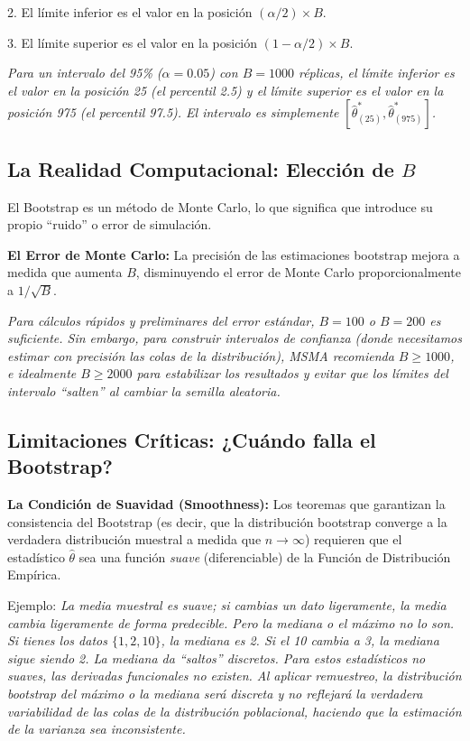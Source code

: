 \documentclass[a4paper]{article}
\begin{document}
2. El límite inferior es el valor en la posición $(\alpha/2) \times B$.

3. El límite superior es el valor en la posición $(1-\alpha/2) \times B$.

\textit{Para un intervalo del 95\% ($\alpha=0.05$) con $B=1000$ réplicas, el límite inferior es el valor en la posición 25 (el percentil 2.5) y el límite superior es el valor en la posición 975 (el percentil 97.5). El intervalo es simplemente $[\hat{\theta}^*_{(25)}, \hat{\theta}^*_{(975)}]$.}

\subsection{La Realidad Computacional: Elección de \texorpdfstring{$B$}{B}}

El Bootstrap es un método de Monte Carlo, lo que significa que introduce su propio ``ruido'' o error de simulación.

\textbf{El Error de Monte Carlo:}
La precisión de las estimaciones bootstrap mejora a medida que aumenta $B$, disminuyendo el error de Monte Carlo proporcionalmente a $1/\sqrt{B}$. 

\textit{Para cálculos rápidos y preliminares del error estándar, $B=100$ o $B=200$ es suficiente. Sin embargo, para construir intervalos de confianza (donde necesitamos estimar con precisión las colas de la distribución), MSMA recomienda $B \ge 1000$, e idealmente $B \ge 2000$ para estabilizar los resultados y evitar que los límites del intervalo ``salten'' al cambiar la semilla aleatoria.}

\subsection{Limitaciones Críticas: ¿Cuándo falla el Bootstrap?}



\textbf{La Condición de Suavidad (Smoothness):}
Los teoremas que garantizan la consistencia del Bootstrap (es decir, que la distribución bootstrap converge a la verdadera distribución muestral a medida que $n \to \infty$) requieren que el estadístico $\hat{\theta}$ sea una función \textit{suave} (diferenciable) de la Función de Distribución Empírica.

Ejemplo: \textit{La media muestral es suave; si cambias un dato ligeramente, la media cambia ligeramente de forma predecible. Pero la mediana o el máximo no lo son. Si tienes los datos $\{1, 2, 10\}$, la mediana es 2. Si el 10 cambia a 3, la mediana sigue siendo 2. La mediana da ``saltos'' discretos. Para estos estadísticos no suaves, las derivadas funcionales no existen. Al aplicar remuestreo, la distribución bootstrap del máximo o la mediana será discreta y no reflejará la verdadera variabilidad de las colas de la distribución poblacional, haciendo que la estimación de la varianza sea inconsistente.}
\end{document}
